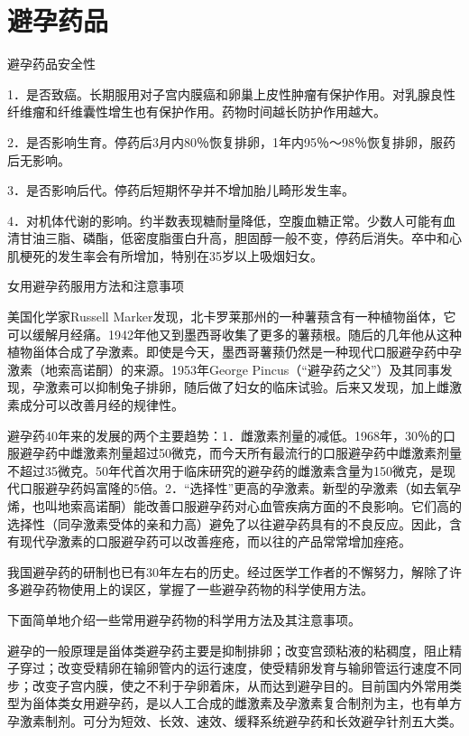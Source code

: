 \documentclass[12pt,UTF8,openany]{ctexbook}
\begin{document}
\chapter{避孕药品}


避孕药品安全性


1．是否致癌。长期服用对子宫内膜癌和卵巢上皮性肿瘤有保护作用。对乳腺良性纤维瘤和纤维囊性增生也有保护作用。药物时间越长防护作用越大。

2．是否影响生育。停药后3月内80％恢复排卵，1年内95％～98％恢复排卵，服药后无影响。

3．是否影响后代。停药后短期怀孕并不增加胎儿畸形发生率。

4．对机体代谢的影响。约半数表现糖耐量降低，空腹血糖正常。少数人可能有血清甘油三脂、磷酯，低密度脂蛋白升高，胆固醇一般不变，停药后消失。卒中和心肌梗死的发生率会有所增加，特别在35岁以上吸烟妇女。





女用避孕药服用方法和注意事项


美国化学家Russell Marker发现，北卡罗莱那州的一种薯蓣含有一种植物甾体，它可以缓解月经痛。1942年他又到墨西哥收集了更多的薯蓣根。随后的几年他从这种植物甾体合成了孕激素。即使是今天，墨西哥薯蓣仍然是一种现代口服避孕药中孕激素（地索高诺酮）的来源。1953年George Pincus（“避孕药之父”）及其同事发现，孕激素可以抑制兔子排卵，随后做了妇女的临床试验。后来又发现，加上雌激素成分可以改善月经的规律性。

避孕药40年来的发展的两个主要趋势：1．雌激素剂量的减低。1968年，30％的口服避孕药中雌激素剂量超过50微克，而今天所有最流行的口服避孕药中雌激素剂量不超过35微克。50年代首次用于临床研究的避孕药的雌激素含量为150微克，是现代口服避孕药妈富隆的5倍。2．“选择性”更高的孕激素。新型的孕激素（如去氧孕烯，也叫地索高诺酮）能改善口服避孕药对心血管疾病方面的不良影响。它们高的选择性（同孕激素受体的亲和力高）避免了以往避孕药具有的不良反应。因此，含有现代孕激素的口服避孕药可以改善痤疮，而以往的产品常常增加痤疮。

我国避孕药的研制也已有30年左右的历史。经过医学工作者的不懈努力，解除了许多避孕药物使用上的误区，掌握了一些避孕药物的科学使用方法。

下面简单地介绍一些常用避孕药物的科学用方法及其注意事项。

避孕的一般原理是甾体类避孕药主要是抑制排卵；改变宫颈粘液的粘稠度，阻止精子穿过；改变受精卵在输卵管内的运行速度，使受精卵发育与输卵管运行速度不同步；改变子宫内膜，使之不利于孕卵着床，从而达到避孕目的。目前国内外常用类型为甾体类女用避孕药，是以人工合成的雌激素及孕激素复合制剂为主，也有单方孕激素制剂。可分为短效、长效、速效、缓释系统避孕药和长效避孕针剂五大类。
\end{document}
